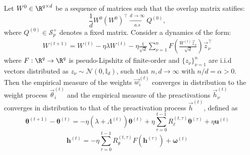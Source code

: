 \begin{theorem}
\label{2402:thm:Cedric_theorem}
Let $W^{0} \in \R^{q \times d}$ be a sequence of matrices such that the overlap matrix satifies:
\begin{equation}
    \frac{1}{d}W^{0}(W^{0})^\top \xrightarrow[a.s]{d \rightarrow \infty} Q^{(0)},
\end{equation}
where $Q^{(0)} \in \mathcal{S}^+_p$ denotes
a fixed matrix.  Consider a dynamics of the form:
    \begin{align}
        W^{(t+1)} =  W^{(t)} - \eta \lambda W^{(t)} - \eta \frac{1}{\sqrt{d}}\sum_{\nu=1}^n F\left(\frac{ W^{(t)}\vec z_\nu} {\sqrt{d}}\right) \vec z_\nu^\top
    \end{align}
where $F:\R^q \rightarrow \R^q$ is pseudo-Lipshitz of finite-order and $\{z_\nu\}_{\nu =1}^n $ are i.i.d vectors distributed as $z_\nu \sim \mathcal{N}(0, \mathbb{I}_d)$, such that $n,d \rightarrow \infty$ with $n/d =\alpha >0$.
    Then the empirical measure of the weights $ \vec w^{(t)}_i$ converges in distribution to the weight process $\vec \theta_i^{(t)}$ and the  empirical measure of the preactivations $\vec h^{(t)}_\nu$ converges in distribution to that of the  preactivation process $\vec h^{(t)}$, defined as    
    \begin{equation}\label{2402:eq:proc_theta}
        \boldsymbol{\theta}^{(t+1)} -  \boldsymbol{\theta}^{(t)}= -  \eta  \left(\lambda + \Lambda^{(t)}\right)\boldsymbol{\theta}^{(t)} + \eta \sum_{\tau=0}^{t-1}  R_\ell^{(t,\tau)} \boldsymbol{\theta}^{(\tau)} +  \eta \boldsymbol{u}^{(t)}
    \end{equation}
    \begin{equation}\label{2402:eq:proc_h}
        \boldsymbol{h}^{(t)} = -\eta\sum_{\tau=0}^{t-1} R_\theta^{(t,\tau)} F(\boldsymbol{h}^{(\tau)}) + \boldsymbol{\omega}^{(t)}
    \end{equation}

\end{theorem}
